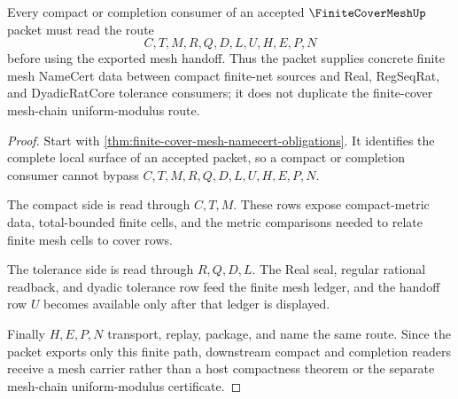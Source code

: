\begin{theorem}
\label{thm:finite-cover-mesh-compact-handoff}
Every compact or completion consumer of an accepted $\FiniteCoverMeshUp$ packet must read the route
$$
C,T,M,R,Q,D,L,U,H,E,P,N
$$
before using the exported mesh handoff. Thus the packet supplies concrete finite mesh NameCert data between compact finite-net sources and Real, RegSeqRat, and DyadicRatCore tolerance consumers; it does not duplicate the finite-cover mesh-chain uniform-modulus route.
\end{theorem}
\begin{proof}
Start with \autoref{thm:finite-cover-mesh-namecert-obligations}. It identifies the complete local surface of an accepted packet, so a compact or completion consumer cannot bypass $C,T,M,R,Q,D,L,U,H,E,P,N$.

The compact side is read through $C,T,M$. These rows expose compact-metric data, total-bounded finite cells, and the metric comparisons needed to relate finite mesh cells to cover rows.

The tolerance side is read through $R,Q,D,L$. The Real seal, regular rational readback, and dyadic tolerance row feed the finite mesh ledger, and the handoff row $U$ becomes available only after that ledger is displayed.

Finally $H,E,P,N$ transport, replay, package, and name the same route. Since the packet exports only this finite path, downstream compact and completion readers receive a mesh carrier rather than a host compactness theorem or the separate mesh-chain uniform-modulus certificate.
\end{proof}




